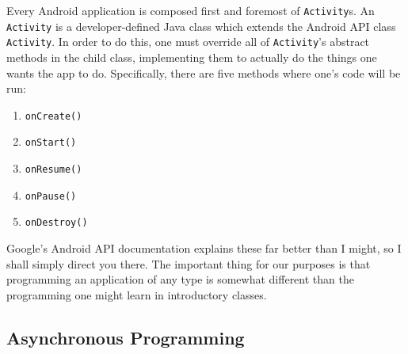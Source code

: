 \documentclass{report}
\begin{document}
Every Android application is composed first and foremost of \verb|Activity|s. An \verb|Activity| is a developer-defined Java class which extends the 
Android API class \verb|Activity|. In order to do this, one must override all of \verb|Activity|'s abstract methods in the child class, implementing them
to actually do the things one wants the app to do. Specifically, there are five methods where one's code will be run:

\begin{enumerate}
\item{\verb|onCreate()|}
\item{\verb|onStart()|}
\item{\verb|onResume()|}
\item{\verb|onPause()|}
\item{\verb|onDestroy()|}
\end{enumerate}

Google's Android API documentation explains these far better than I might, so I shall simply direct you there. The important thing for our
purposes is that programming an application of any type is somewhat different than the programming one might learn in introductory classes.

\subsection{Asynchronous Programming}
\end{document}
